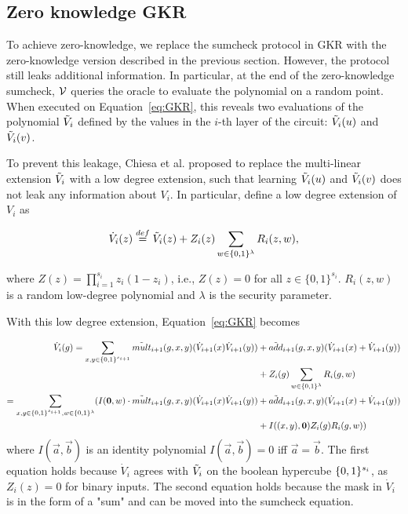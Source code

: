 \subsection{Zero knowledge GKR}\label{subsec::zkgkr}

To achieve zero-knowledge, we replace the sumcheck protocol in GKR with the zero-knowledge version described in the previous section. However, the protocol still leaks additional information. In particular, at the end of the zero-knowledge sumcheck, $\mathcal{V}$ queries the oracle to evaluate the polynomial on a random point. When executed on Equation~\ref{eq:GKR}, this reveals two evaluations of the polynomial $\tilde{V}_i$ defined by the values in the $i$-th layer of the circuit: $\tilde{V}_i(u)$ and $\tilde{V}_i(v)$.


To prevent this leakage, Chiesa et al.\cite{zksumcheck} proposed to replace the multi-linear extension $\tilde{V}_i$ with a low degree extension, such that learning $\tilde{V}_i(u)$ and $\tilde{V}_i(v)$ does not leak any information about $V_i$. In particular, define a low degree extension of $V_i$ as 

\begin{equation}\label{eq:lde}
\dot{V}_{i}(z) \overset{def}{=} \tilde{V}_i(z)+Z_i(z)\sum\limits_{w \in \{0, 1\}^\lambda}R_i(z, w),
\end{equation}

where $Z(z) = \prod_{i=1}^{s_i} z_i(1-z_i)$, i.e., $Z(z)=0$ for all $z\in\{0, 1\}^{s_i}$. $R_i(z,w)$ is a random low-degree polynomial and $\lambda$ is the security parameter. 

With this low degree extension, Equation~\ref{eq:GKR} becomes

\begin{align}\label{eq:zkGKR}
\dot{V}_{i}(g)=\sum_{x, y\in \binary^{s_{i+1}}}\tilde{mult}_{i+1}(g, x, y)(\dot{V}_{i+1}(x)\dot{V}_{i+1}(y))&+\tilde{add}_{i+1}(g,x,y)(\dot{V}_{i+1}(x)+\dot{V}_{i+1}(y))\nonumber\\
&+ Z_i(g)\sum\limits_{w \in \binary^\lambda}R_i(g, w)\nonumber\\
=\sum_{x, y\in \binary^{s_{i+1}},w \in \binary^\lambda}(I(\vec{0},w) \cdot \tilde{mult}_{i+1}(g, x, y)(\dot{V}_{i+1}(x)\dot{V}_{i+1}(y))&+\tilde{add}_{i+1}(g,x,y)(\dot{V}_{i+1}(x)+\dot{V}_{i+1}(y))\nonumber\\
&+ I((x, y), \vec{0})Z_i(g)R_i(g, w))
\end{align}
where $I(\vec{a},\vec{b})$ is an identity polynomial $I(\vec{a},\vec{b}) = 0$ iff $\vec{a}=\vec{b}$. The first equation holds because $\dot{V}_i$ agrees with $\tilde{V}_i$ on the boolean hypercube $\{0,1\}^{s_i}$, as $Z_i(z) = 0$ for binary inputs. The second equation holds because the mask in $\dot{V}_i$ is in the form of a "sum" and can be moved into the sumcheck equation. 

